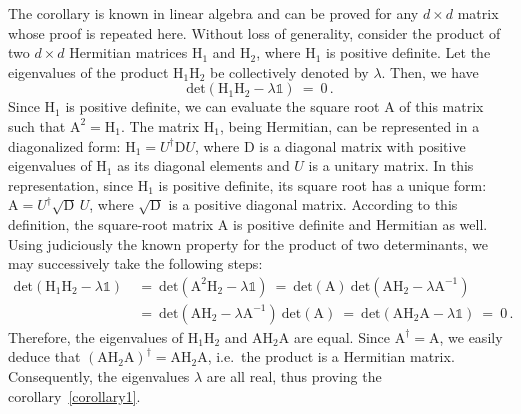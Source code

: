 \documentclass[12pt,a4paper]{article}
\begin{document}
The corollary is known in linear algebra and can be proved for any $d\times d$ matrix whose proof is repeated here. Without loss of generality, consider the product of two $d\times d$ Hermitian matrices $\mathrm{H_1}$ and $\mathrm{H_2}$, where $\mathrm{H_1}$ is positive definite. Let the eigenvalues of the product $\mathrm{H_1H_2}$ be collectively denoted by $\lambda$. Then,
we have
\begin{equation}
    \text{det}(\mathrm{H}_1\mathrm{H}_2 - \lambda\mathbb{1}) \:=\: 0\,.
\end{equation}
Since $\mathrm{H_1}$ is positive definite, we can evaluate the square root A of this matrix such that $\mathrm{A^2 = H_1}$. The matrix $\mathrm{H}_1$, being Hermitian, can be represented in a diagonalized form: $\mathrm{H_1} = U^\dagger \mathrm{D} U$, where $\mathrm{D}$ is a diagonal matrix with positive eigenvalues of $\mathrm{H}_1$ as its diagonal elements and $U$ is a unitary matrix. In this representation, since $\mathrm{H}_1$ is positive definite, its square root has a unique form: $\mathrm{A} = U^\dagger \sqrt{\mathrm{D}}\,U$, where $\sqrt{\mathrm{D}}$ is a positive diagonal matrix. According to this definition, the square-root matrix $\text{A}$ is positive definite and Hermitian as well.
Using judiciously the known property for the product of two determinants, we may successively take the following steps:
\begin{equation}
    \begin{aligned}
      \text{det}(\mathrm{H_1}\mathrm{H}_2 - \lambda\mathbb{1})\ &=\  \text{det}(\mathrm{A}^2\mathrm{H}_2 - \lambda\mathbb{1})\ =\ \text{det}(\mathrm{A})\:\text{det}(\mathrm{A}\mathrm{H}_2 - \lambda\mathrm{A}^{-1})\\
      &=\        \text{det}(\mathrm{A}\mathrm{H}_2 - \lambda\mathrm{A}^{-1})\:\text{det}(\mathrm{A})\ =\ \text{det}(\mathrm{A}\mathrm{H}_2\mathrm{A} - \lambda\mathbb{1})\ =\ 0\, .
    \end{aligned}
\end{equation}
Therefore, the eigenvalues of $\mathrm{H}_1\mathrm{H}_2$ and $\mathrm{AH_2A}$ are equal. Since $\mathrm{A}^\dagger = \mathrm{A}$, we easily deduce that $\mathrm{(AH_2A)}^\dagger = \mathrm{AH_2A}$, i.e.~the product  is a Hermitian matrix. Consequently, the eigenvalues $\lambda$ are all real, thus proving the corollary~\ref{corollary1}.
\end{document}

